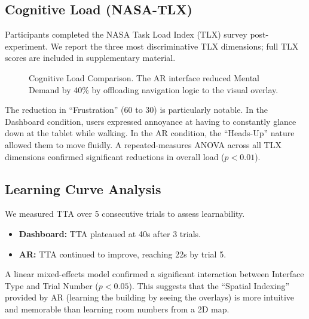\documentclass[conference]{IEEEtran}
\begin{document}
\subsection{Cognitive Load (NASA-TLX)}
Participants completed the NASA Task Load Index (TLX) survey post-experiment. We report the three most discriminative TLX dimensions; full TLX scores are included in supplementary material.

\begin{figure}[htbp]
\centering
{}
\caption{Cognitive Load Comparison. The AR interface reduced Mental Demand by 40\% by offloading navigation logic to the visual overlay.}
\label{fig:tlx}
\end{figure}

The reduction in ``Frustration'' (60 to 30) is particularly notable. In the Dashboard condition, users expressed annoyance at having to constantly glance down at the tablet while walking. In the AR condition, the ``Heads-Up'' nature allowed them to move fluidly. A repeated-measures ANOVA across all TLX dimensions confirmed significant reductions in overall load ($p < 0.01$).

\subsection{Learning Curve Analysis}
We measured TTA over 5 consecutive trials to assess learnability.
\begin{itemize}
    \item \textbf{Dashboard:} TTA plateaued at 40s after 3 trials.
    \item \textbf{AR:} TTA continued to improve, reaching 22s by trial 5.
\end{itemize}
A linear mixed-effects model confirmed a significant interaction between Interface Type and Trial Number ($p < 0.05$). This suggests that the ``Spatial Indexing'' provided by AR (learning the building by seeing the overlays) is more intuitive and memorable than learning room numbers from a 2D map.
\end{document}
